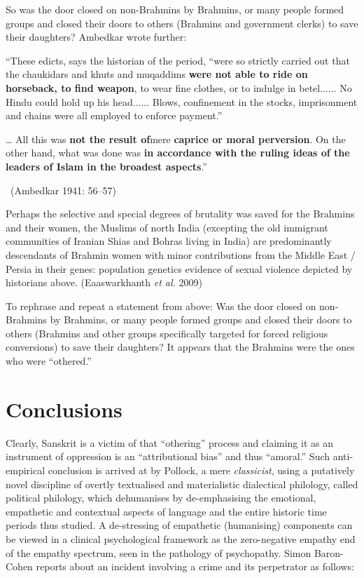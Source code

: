 So was the door closed on non-Brahmins by Brahmins, or many people formed groups and closed their doors to others (Brahmins and government clerks) to save their daughters? Ambedkar wrote further:

\begin{myquote}
“These edicts, says the historian of the period, “were so strictly carried out that the chaukidars and khuts and muqaddims \textbf{were not able to ride on horseback, to find weapon}, to wear fine clothes, or to indulge in betel...... No Hindu could hold up his head...... Blows, confinement in the stocks, imprisonment and chains were all employed to enforce payment.”
\end{myquote}

\begin{myquote}
… All this was \textbf{not the result of}mere \textbf{caprice or moral perversion}. On the other hand, what was done was \textbf{in accordance with the ruling ideas of the leaders of Islam in the broadest aspects}.” 

~\hfill (Ambedkar 1941: 56–57)
\end{myquote}

Perhaps the selective and special degrees of brutality was saved for the Brahmins and their women, the Muslims of north India (excepting the old immigrant communities of Iranian Shias and Bohras living in India) are predominantly descendants of Brahmin women with minor contributions from the Middle East / Persia in their genes: population genetics evidence of sexual violence depicted by historians above. (Eaaswarkhanth \textit{et al.} 2009)

To rephrase and repeat a statement from above: Was the door closed on non-Brahmins by Brahmins, or many people formed groups and closed their doors to others (Brahmins and other groups specifically targeted for forced religious conversions) to save their daughters? It appears that the Brahmins were the ones who were “othered.”

\vspace{-.3cm}

\section*{Conclusions}

Clearly, Sanskrit is a victim of that “othering” process and claiming it as an instrument of oppression is an “attributional bias” and thus “amoral.” Such anti-empirical conclusion is arrived at by Pollock, a mere \textit{classicist}, using a putatively novel discipline of overtly textualised and materialistic dialectical philology, called political philology, which dehumanises by de-emphasising the emotional, empathetic and contextual aspects of language and the entire historic time periods thus studied. A de-stressing of empathetic (humanising) components can be viewed in a clinical psychological framework as the zero-negative empathy end of the empathy spectrum, seen in the pathology of psychopathy. Simon Baron-Cohen reports about an incident involving a crime and its perpetrator as follows:

